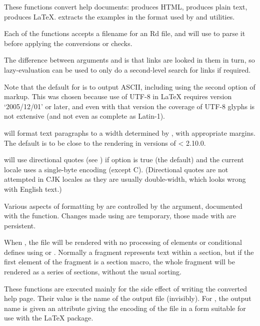 \begin{Details}\relax
These functions convert help documents:  produces HTML,
 produces plain text,  produces LaTeX.
 extracts the examples in the format used by
 and \R{} utilities.

Each of the functions accepts a filename for an Rd file, and
will use  to parse it before applying the
conversions or checks.

The difference between arguments  and  is that
links are looked in them in turn, so lazy-evaluation can be used to
only do a second-level search for links if required.

Note that the default for  is to output ASCII,
including using the second option of  markup.  This was
chosen because use of UTF-8 in LaTeX requires version
`2005/12/01' or later, and even with that version the coverage
of UTF-8 glyphs is not extensive (and not even as complete as
Latin-1).

 will format text paragraphs to a width determined by
, with appropriate margins.  The default is to be close to
the rendering in versions of \R{} < 2.10.0.

 will use directional quotes (see )
if option  is true (the default) and
the current locale uses a single-byte encoding (except C).
(Directional quotes are not attempted in CJK locales as they are
usually double-width, which looks wrong with English text.)

Various aspects of formatting by  are controlled by the
 argument, documented with the 
function. Changes made using  are temporary, those
made with  are persistent.

When , the  file will be rendered
with no processing of  elements or conditional defines
using  or .  Normally a fragment represents
text within a section, but if the first element of the fragment
is a section macro, the whole fragment will be rendered as 
a series of sections, without the usual sorting.
\end{Details}
%
\begin{Value}
These functions are executed mainly for the side effect of
writing the converted help page.  Their value is the name of the output
file (invisibly).  For , the output name is given an
attribute  giving the encoding of the file in a
form suitable for use with the LaTeX  package.
\end{Value}
